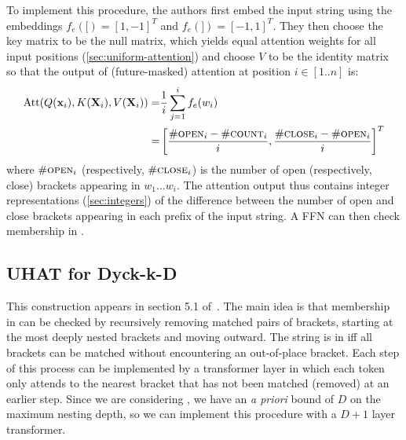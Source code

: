   To implement this procedure, the authors first embed the input string using the embeddings $f_e([) = [1,-1]^T$ and $f_e(]) = [-1,1]^T$. They then choose the key matrix to be the null matrix, which yields equal attention weights for all input positions (\cref{sec:uniform-attention}) and choose $V$ to be the identity matrix so that the output of (future-masked) attention at position $i \in [1..n]$ is:\begin{align*}
    \mathrm{Att}(Q(\mathbf{x}_i), K(\mathbf{X}_i), V(\mathbf{X}_i)) = & \frac{1}{i}\sum_{j=1}^i f_e(w_i)\\
    = & \left[ \frac{{\#}\textsc{open}_i - {\#}\textsc{count}_i}{i}, \frac{{\#}\textsc{close}_i - {\#}\textsc{open}_i}{i}\right]^T
\end{align*}
where ${\#}\textsc{open}_i$ (respectively, ${\#}\textsc{close}_i$) is the number of open (respectively, close) brackets appearing in $w_1\ldots w_i$. The attention output thus contains integer representations (\cref{sec:integers}) of the difference between the number of open and close brackets appearing in each prefix of the input string. A FFN can then check membership in .

\subsection{UHAT for Dyck-k-D}
This construction appears in section 5.1 of~\citet{yao-2021-self-attention}.
The main idea is that membership in  can be checked by recursively removing matched pairs of brackets, starting at the most deeply nested brackets and moving outward. The string is in  iff all brackets can be matched without encountering an out-of-place bracket. Each step of this process can be implemented by a transformer layer in which each token only attends to the nearest bracket that has not been matched (removed) at an earlier step. Since we are considering , we have an \textit{a priori} bound of $D$ on the maximum nesting depth, so we can implement this procedure with a $D+1$ layer transformer. 

